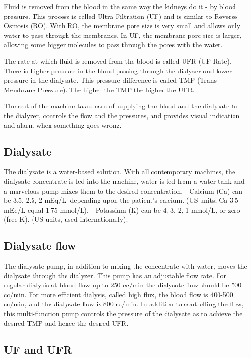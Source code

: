 \documentclass[
  11pt,
  letterpaper,
  DIV=11,
  numbers=noendperiod]{scrreprt}
\begin{document}
Fluid is removed from the blood in the same way the kidneys do it - by
blood pressure. This process is called Ultra Filtration (UF) and is
similar to Reverse Osmosis (RO). With RO, the membrane pore size is very
small and allows only water to pass through the membranes. In UF, the
membrane pore size is larger, allowing some bigger molecules to pass
through the pores with the water.

The rate at which fluid is removed from the blood is called UFR (UF
Rate). There is higher pressure in the blood passing through the
dialyzer and lower pressure in the dialysate. This pressure difference
is called TMP (Trans Membrane Pressure). The higher the TMP the higher
the UFR.

The rest of the machine takes care of supplying the blood and the
dialysate to the dialyzer, controls the flow and the pressures, and
provides visual indication and alarm when something goes wrong.

\subsection{Dialysate}\label{dialysate}

The dialysate is a water-based solution. With all contemporary machines,
the dialysate concentrate is fed into the machine, water is fed from a
water tank and a marvelous pump mixes them to the desired concentration.
- Calcium (Ca) can be 3.5, 2.5, 2 mEq/L, depending upon the patient's
calcium. (US units; Ca 3.5 mEq/L equal 1.75 mmol/L). - Potassium (K) can
be 4, 3, 2, 1 mmol/L, or zero (free-K). (US units, used
internationally).

\subsection{Dialysate flow}\label{dialysate-flow}

The dialysate pump, in addition to mixing the concentrate with water,
moves the dialysate through the dialyzer. This pump has an adjustable
flow rate. For regular dialysis at blood flow up to 250 cc/min the
dialysate flow should be 500 cc/min. For more efficient dialysis, called
high flux, the blood flow is 400-500 cc/min, and the dialysate flow is
800 cc/min. In addition to controlling the flow, this multi-function
pump controls the pressure of the dialysate as to achieve the desired
TMP and hence the desired UFR.

\subsection{UF and UFR}\label{uf-and-ufr}
\end{document}
